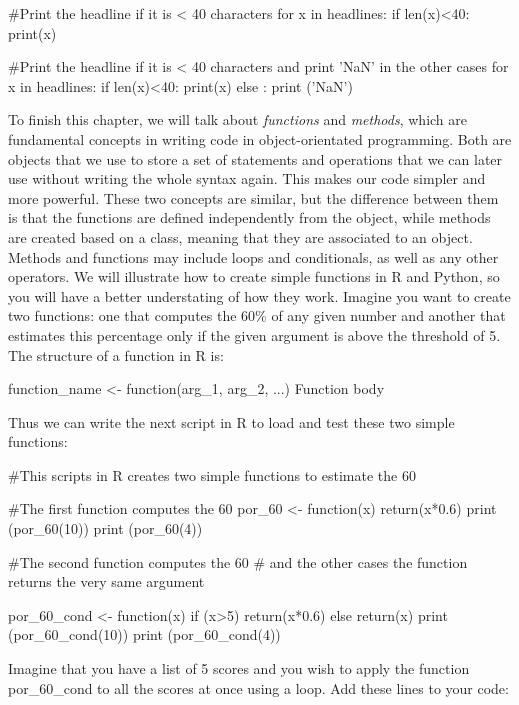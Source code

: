 \begin{examplepy}
#Print the headline if it is < 40 characters
for x in headlines:
  if len(x)<40:
    print(x)

#Print the headline if it is < 40 characters and print 'NaN' in the other cases
for x in headlines:
  if len(x)<40:
    print(x)
  else :
    print ('NaN')
\end{examplepy}

To finish this chapter, we will talk about \emph{functions} and \emph{methods}, which are fundamental concepts in writing code in object-orientated programming. Both are objects that we use to store a set of statements and operations that we can later use without writing the whole syntax again. This makes our code simpler and more powerful. These two concepts are similar, but the difference between them is that the functions are defined independently from the object, while methods are created based on a class, meaning that they are associated to an object. Methods and functions may include loops and conditionals, as well as any other operators.  We will illustrate how to create simple functions in R and Python, so you will have a better understating of how they work. Imagine you want to create two functions: one that computes the 60\% of any given number and another that estimates this percentage only if the given argument is above the threshold of 5. The structure of a function in R is:

\begin{exampler}
function_name <- function(arg_1, arg_2, ...) {
   Function body 
}
\end{exampler}

Thus we can write the next script in R to load and test these two simple functions:

\begin{exampler}
#This scripts in R creates two simple functions to estimate the 60%

#The first function computes the 60%
por_60 <- function(x) {
  return(x*0.6) 
}
print (por_60(10))
print (por_60(4))

#The second function computes the 60%
# and the other cases the function returns the very same argument

por_60_cond <- function(x) {
  if (x>5) {
    return(x*0.6)
  } else {
    return(x)
  }
}
print (por_60_cond(10))
print (por_60_cond(4))
\end{exampler}

Imagine that you have a list of 5 scores and you wish to apply the function por\_60\_cond to all the scores at once using a loop. Add these lines to your code:


